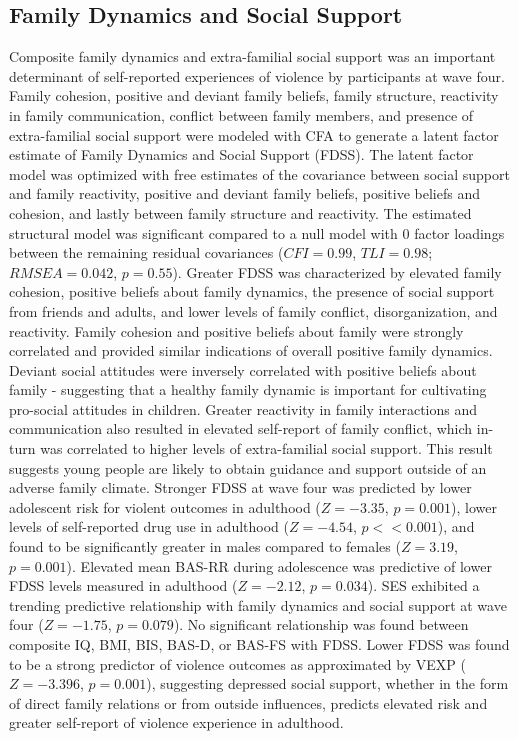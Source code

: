 \documentclass[utf8]{frontiersSCNS} %
\begin{document}
\subsection{Family Dynamics and Social Support} Composite family dynamics and extra-familial social support was an important determinant of self-reported experiences of violence by participants at wave four. Family cohesion, positive and deviant family beliefs, family structure, reactivity in family communication, conflict between family members, and presence of extra-familial social support were modeled with CFA to generate a latent factor estimate of Family Dynamics and Social Support (FDSS). The latent factor model was optimized with free estimates of the covariance between social support and family reactivity, positive and deviant family beliefs, positive beliefs and cohesion, and lastly between family structure and reactivity. The estimated structural model was significant compared to a null model with $0$ factor loadings between the remaining residual covariances ($CFI=0.99$, $TLI=0.98$; $RMSEA=0.042$, $p=0.55$). Greater FDSS was characterized by elevated family cohesion, positive beliefs about family dynamics, the presence of social support from friends and adults, and lower levels of family conflict, disorganization, and reactivity. Family cohesion and positive beliefs about family were strongly correlated and provided similar indications of overall positive family dynamics. Deviant social attitudes were inversely correlated with positive beliefs about family  - suggesting that a healthy family dynamic is important for cultivating pro-social attitudes in children. Greater reactivity in family interactions and communication also resulted in elevated self-report of family conflict, which in-turn was correlated to higher levels of extra-familial social support. This result suggests young people are likely to obtain guidance and support outside of an adverse family climate. Stronger FDSS at wave four was predicted by lower adolescent risk for violent outcomes in adulthood ($Z=-3.35$, $p=0.001$), lower levels of self-reported drug use in adulthood ($Z=-4.54$, $p<<0.001$), and found to be significantly greater in males compared to females ($Z=3.19$, $p=0.001$).  Elevated mean BAS-RR during adolescence was predictive of lower FDSS levels measured in adulthood ($Z=-2.12$, $p=0.034$). SES exhibited a trending predictive relationship with family dynamics and social support at wave four ($Z=-1.75$, $p=0.079$). No significant relationship was found between composite IQ, BMI, BIS, BAS-D, or BAS-FS with FDSS. Lower FDSS was found to be a strong predictor of violence outcomes as approximated by VEXP ($Z=-3.396$, $p=0.001$), suggesting depressed social support, whether in the form of direct family relations or from outside influences, predicts elevated risk and greater self-report of violence experience in adulthood.
\end{document}

